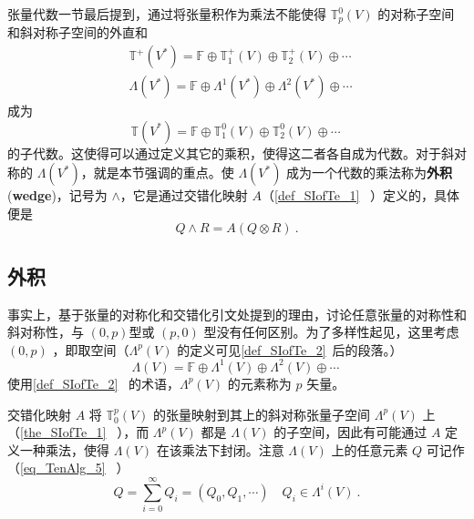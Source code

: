 



张量代数一节最后提到，通过将张量积作为乘法不能使得 $\mathbb T_p^0(V)$ 的对称子空间和斜对称子空间的外直和 
\begin{equation}
\begin{aligned}
&\mathbb T^+(V^*)=\mathbb F\oplus\mathbb T_1^+(V)\oplus\mathbb T_2^+(V)\oplus\cdots\\
&\Lambda(V^*)=\mathbb F\oplus \Lambda^1(V^*)\oplus\Lambda^2(V^*)\oplus\cdots
\end{aligned}~
\end{equation}
成为 
\begin{equation}
\mathbb T(V^*)=\mathbb F\oplus\mathbb T_1^0(V)\oplus\mathbb T_2^0(V)\oplus\cdots~
\end{equation}
的子代数。这使得可以通过定义其它的乘积，使得这二者各自成为代数。对于斜对称的 $\Lambda(V^*)$，就是本节强调的重点。使 $\Lambda(V^*)$ 成为一个代数的乘法称为\textbf{外积}(\textbf{wedge})，记号为 $\wedge$，它是通过交错化映射 $A$（\autoref{def_SIofTe_1}~ ）定义的，具体便是
\begin{equation}
Q\wedge R=A(Q\otimes R)~.
\end{equation}

\subsection{外积}
事实上，基于张量的对称化和交错化引文处提到的理由，讨论任意张量的对称性和斜对称性，与 $(0,p)$型或 $(p,0)$ 型没有任何区别。为了多样性起见，这里考虑 $(0,p)$ ，即取空间（$\Lambda^p(V)$ 的定义可见\autoref{def_SIofTe_2}~后的段落。） 
\begin{equation}\label{eq_WegofT_9}
\Lambda(V)=\mathbb F\oplus \Lambda^1(V)\oplus\Lambda^2(V)\oplus\cdots~
\end{equation}
使用\autoref{def_SIofTe_2}~ 的术语，$\Lambda^p(V)$ 的元素称为 $p$ 矢量。

交错化映射 $A$ 将 $\mathbb T_0^p(V)$ 的张量映射到其上的斜对称张量子空间 $\Lambda^p(V)$ 上（\autoref{the_SIofTe_1}~ ），而 $\Lambda^p(V)$ 都是 $\Lambda(V)$ 的子空间，因此有可能通过 $A$ 定义一种乘法，使得 $\Lambda(V)$ 在该乘法下封闭。注意 $ \Lambda(V)$ 上的任意元素 $Q$ 可记作（\autoref{eq_TenAlg_5}~ ）
\begin{equation}\label{eq_WegofT_2}
Q=\sum_{i=0}^\infty Q_i=(Q_0,Q_1,\cdots) \quad Q_i\in\Lambda^i(V)~.
\end{equation}

